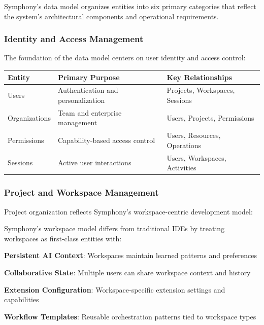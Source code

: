 Symphony's data model organizes entities into six primary categories that reflect the system's architectural components and operational requirements.

\subsubsection*{Identity and Access Management}

The foundation of the data model centers on user identity and access control:

\begin{center}
\begin{tabular}{@{}lll@{}}
\toprule
\textbf{Entity} & \textbf{Primary Purpose} & \textbf{Key Relationships} \\
\midrule
Users & Authentication and personalization & Projects, Workspaces, Sessions \\
Organizations & Team and enterprise management & Users, Projects, Permissions \\
Permissions & Capability-based access control & Users, Resources, Operations \\
Sessions & Active user interactions & Users, Workspaces, Activities \\
\bottomrule
\end{tabular}
\end{center}

\subsubsection*{Project and Workspace Management}

Project organization reflects Symphony's workspace-centric development model:

\begin{infobox}[title=Workspace-Centric Design Philosophy]
Symphony's workspace model differs from traditional IDEs by treating workspaces as first-class entities with:
\begin{compactlist}
    \item \textbf{Persistent AI Context}: Workspaces maintain learned patterns and preferences
    \item \textbf{Collaborative State}: Multiple users can share workspace context and history
    \item \textbf{Extension Configuration}: Workspace-specific extension settings and capabilities
    \item \textbf{Workflow Templates}: Reusable orchestration patterns tied to workspace types
\end{compactlist}
\end{infobox}

